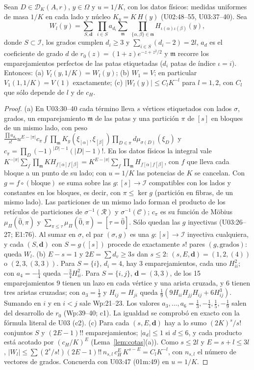\begin{lema}\label{lem:id}
Sean $D\in\mathcal D_K(A,r)$, $y\in\Omega$ y $u=1/K$, con los datos físicos: medidas uniformes de
masa $1/K$ en cada lado y núcleo $K_y=K\,H(y)$ (U02:48--55, U03:37--40). Sea
\[
 W_l(y)=\sum_{S,\mathbf d}\ \prod_{i\in S}a_{d_i}\sum_{\mathfrak m}\ \prod_{\{\alpha,\beta\}\in\mathfrak m}
 H_{\iota(\alpha)\iota(\beta)}(y),
\]
donde $S\subset\mathcal I$, los grados cumplen $d_i\ge3$ y $\sum_{i\in S}(d_i-2)=2l$, $a_d$ es el
coeficiente de grado $d$ de $r_0(z)=(1+z)e^{-z+z^2/2}$ y $\mathfrak m$ recorre los emparejamientos
perfectos de las patas etiquetadas ($d_i$ patas de índice $\iota=i$). Entonces:
(a) $V_l(y,1/K)=W_l(y)$; (b) $W_1=V$; en particular $V_1(1,1/K)=V(1)$ exactamente;
(c) $|W_l(y)|\le C_lK^{-l}$ para $l=1,2$, con $C_l$ que sólo depende de $l$ y de $c_H$.
\end{lema}
\begin{proof}
(a) En U03:30--40 cada término lleva $s$ vértices etiquetados con lados $\sigma$, grados, un
emparejamiento $\mathfrak m$ de las patas y una partición $\pi$ de $[s]$ en bloques de un mismo
lado, con peso $\frac{\prod a_{d_v}}{s!}u^{E-|\pi|}c_\pi\int\prod_{\mathfrak m}
K_y(\xi_{[\alpha]},\xi_{[\beta]})\prod_{D\in\pi}d\mu_{\sigma(D)}(\xi_D)$ y
$c_\pi=\prod_{D}(-1)^{|D|-1}(|D|-1)!$. En los datos físicos la integral vale
$K^{-|\pi|}\sum_f\prod_{\mathfrak m}KH_{f[\alpha]f[\beta]}
=K^{E-|\pi|}\sum_f\prod_{\mathfrak m}H_{f[\alpha]f[\beta]}$,
con $f$ que lleva cada bloque a un punto de su lado; con $u=1/K$ las potencias de $K$ se cancelan.
Con $g=f\circ(\text{bloque})$ se suma sobre las $g:[s]\to\mathcal I$ compatibles con los lados y
constantes en los bloques, es decir, con $\pi\le\ker g$ (partición en fibras, de un mismo lado).
Las particiones de un mismo lado forman el producto de los retículos de particiones de
$\sigma^{-1}(\mathcal R)$ y $\sigma^{-1}(\mathcal C)$; $c_\pi$ es su función de Möbius $\mu_\Pi(\hat0,\pi)$
y $\sum_{\pi\le\tau}\mu_\Pi(\hat0,\pi)=[\tau=\hat0]$. Sólo quedan las $g$ inyectivas (U03:26--27;
E1:76). Al sumar en $\sigma$, el par $(\sigma,g)$ es una $g:[s]\to\mathcal I$ inyectiva cualquiera, y
cada $(S,\mathbf d)$ con $S=g([s])$ procede de exactamente $s!$ pares $(g,\text{grados})$: queda $W_l$.
(b) $E-s=1$ y $2E=\sum d_v\ge3s$ dan $s\le2$: $(s,E,\mathbf d)=(1,2,(4))$ o $(2,3,(3,3))$. Para
$S=\{i\}$, $d_i=4$, hay 3 emparejamientos, cada uno $H_{ii}^2$; con $a_4=-\frac14$ queda
$-\frac34H_{ii}^2$. Para $S=\{i,j\}$, $\mathbf d=(3,3)$, de los 15 emparejamientos 9 tienen un lazo
en cada vértice y una arista cruzada, y 6 tienen tres aristas cruzadas; con $a_3=\frac13$ y
$H_{ij}=H_{ji}$ queda $\frac19(9H_{ii}H_{jj}H_{ij}+6H_{ij}^3)$. Sumando en $i$ y en $i<j$ sale
Wp:21--23. Los valores $a_3,\dots,a_6=\frac13,-\frac14,\frac15,-\frac19$ salen del desarrollo de
$r_0$ (Wp:39--40; c1). La igualdad se comprobó en exacto con la fórmula literal de U03 (c2).
(c) Para cada $(s,E,\mathbf d)$ hay a lo sumo $(2K)^s/s!$ conjuntos $S$ y $(2E-1)!!$ emparejamientos;
$|a_d|\le1$ si $d\le6$, y cada producto está acotado por $(c_H/K)^E$ (Lema~\ref{lem:cotas}(a)).
Como $s\le2l$ y $E=s+l\le3l$, $|W_l|\le\sum(2^s/s!)(2E-1)!!\,n_{s,l}\,c_H^E\,K^{s-E}=C_lK^{-l}$,
con $n_{s,l}$ el número de vectores de grados. Concuerda con U03:47 (01m:49) en $u=1/K$.
\end{proof}
